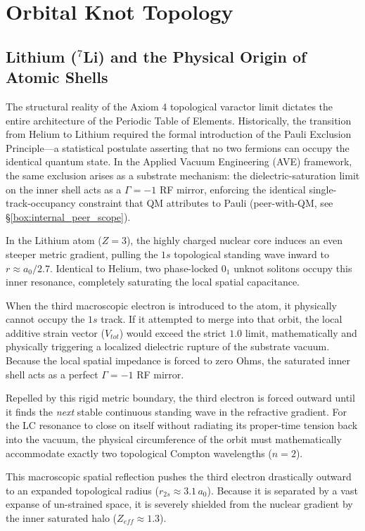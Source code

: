 \section{Orbital Knot Topology}
\subsection{Lithium ($^7$Li) and the Physical Origin of Atomic Shells}

The structural reality of the Axiom 4 topological varactor limit dictates the entire architecture of the Periodic Table of Elements. Historically, the transition from Helium to Lithium required the formal introduction of the Pauli Exclusion Principle---a statistical postulate asserting that no two fermions can occupy the identical quantum state. In the Applied Vacuum Engineering (AVE) framework, the same exclusion arises as a substrate mechanism: the dielectric-saturation limit on the inner shell acts as a $\Gamma=-1$\gammaundeclared{} RF mirror, enforcing the identical single-track-occupancy constraint that QM attributes to Pauli (peer-with-QM, see \S\ref{box:internal_peer_scope}).

In the Lithium atom ($Z=3$), the highly charged nuclear core induces an even steeper metric gradient, pulling the $1s$ topological standing wave inward to $r \approx a_0 / 2.7$. Identical to Helium, two phase-locked $0_1$ unknot solitons occupy this inner resonance, completely saturating the local spatial capacitance.

When the third macroscopic electron is introduced to the atom, it physically cannot occupy the $1s$ track. If it attempted to merge into that orbit, the local additive strain vector ($V_{tot}$) would exceed the strict $1.0$ limit, mathematically and physically triggering a localized dielectric rupture of the substrate vacuum. Because the local spatial impedance is forced to zero Ohms, the saturated inner shell acts as a perfect $\Gamma = -1$\gammaundeclared{} RF mirror. 




Repelled by this rigid metric boundary, the third electron is forced outward until it finds the \textit{next} stable continuous standing wave in the refractive gradient. For the LC resonance to close on itself without radiating its proper-time tension back into the vacuum, the physical circumference of the orbit must mathematically accommodate exactly two topological Compton wavelengths ($n=2$).

This macroscopic spatial reflection pushes the third electron drastically outward to an expanded topological radius ($r_{2s} \approx 3.1 \, a_0$). Because it is separated by a vast expanse of un-strained space, it is severely shielded from the nuclear gradient by the inner saturated halo ($Z_{eff} \approx 1.3$). 


